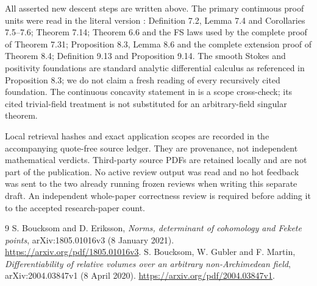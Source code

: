 \documentclass[11pt]{article}
\theoremstyle{remark}
\begin{document}
All asserted new descent steps are written above. The primary
continuous proof units were read in the literal version
\cite{BE}: Definition 7.2, Lemma 7.4 and Corollaries 7.5--7.6;
Theorem 7.14; Theorem 6.6 and the FS laws used by the complete proof
of Theorem 7.31; Proposition 8.3, Lemma 8.6 and the complete
extension proof of Theorem 8.4; Definition 9.13 and Proposition
9.14. The smooth Stokes and positivity foundations are standard
analytic differential calculus as referenced in Proposition 8.3;
we do not claim a fresh reading of every recursively cited
foundation. The continuous concavity statement in
\cite[Section 1.6]{BGM} is a scope cross-check; its cited
trivial-field treatment is not substituted for an arbitrary-field
singular theorem.

Local retrieval hashes and exact application scopes are recorded in
the accompanying quote-free source ledger. They are provenance,
not independent mathematical verdicts. Third-party source PDFs are
retained locally and are not part of the publication. No active
review output was read and no hot feedback was sent to the two
already running frozen reviews when writing this separate draft.
An independent whole-paper correctness review is required before
adding it to the accepted research-paper count.

\begin{thebibliography}{9}
 S. Boucksom and D. Eriksson,
\emph{Norms, determinant of cohomology and Fekete points},
arXiv:1805.01016v3 (8 January 2021).
\url{https://arxiv.org/pdf/1805.01016v3}.
 S. Boucksom, W. Gubler and F. Martin,
\emph{Differentiability of relative volumes over an arbitrary
non-Archimedean field}, arXiv:2004.03847v1 (8 April 2020).
\url{https://arxiv.org/pdf/2004.03847v1}.
\end{thebibliography}
\end{document}
